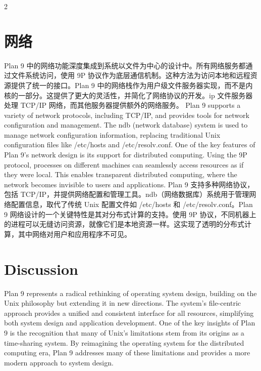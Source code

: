 \documentclass{article}
\begin{document}
\begin{paracol}{2}
\section*{网络}
Plan 9 中的网络功能深度集成到系统以文件为中心的设计中。所有网络服务都通过文件系统访问，使用 9P 协议作为底层通信机制。这种方法为访问本地和远程资源提供了统一的接口。Plan 9 中的网络栈作为用户级文件服务器实现，而不是内核的一部分。这提供了更大的灵活性，并简化了网络协议的开发。ip 文件服务器处理 TCP/IP 网络，而其他服务器提供额外的网络服务。
\switchcolumn*
Plan 9 supports a variety of network protocols, including TCP/IP, and provides tools for network configuration and management. The ndb (network database) system is used to manage network configuration information, replacing traditional Unix configuration files like /etc/hosts and /etc/resolv.conf. One of the key features of Plan 9's network design is its support for distributed computing. Using the 9P protocol, processes on different machines can seamlessly access resources as if they were local. This enables transparent distributed computing, where the network becomes invisible to users and applications.
\switchcolumn
Plan 9 支持多种网络协议，包括 TCP/IP，并提供网络配置和管理工具。ndb（网络数据库）系统用于管理网络配置信息，取代了传统 Unix 配置文件如 /etc/hosts 和 /etc/resolv.conf。Plan 9 网络设计的一个关键特性是其对分布式计算的支持。使用 9P 协议，不同机器上的进程可以无缝访问资源，就像它们是本地资源一样。这实现了透明的分布式计算，其中网络对用户和应用程序不可见。
\switchcolumn*
\section*{Discussion}
Plan 9 represents a radical rethinking of operating system design, building on the Unix philosophy but extending it in new directions. The system's file-centric approach provides a unified and consistent interface for all resources, simplifying both system design and application development. One of the key insights of Plan 9 is the recognition that many of Unix's limitations stem from its origins as a time-sharing system. By reimagining the operating system for the distributed computing era, Plan 9 addresses many of these limitations and provides a more modern approach to system design.
\switchcolumn

\end{paracol}
\end{document}
